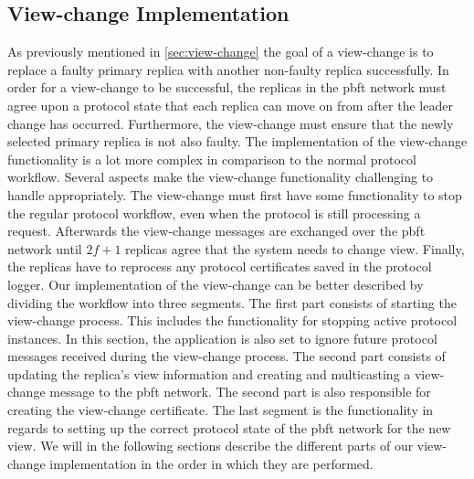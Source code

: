 \subsection{View-change Implementation}
As previously mentioned in \autoref{sec:view-change} the goal of a view-change is to replace a faulty primary replica with another non-faulty replica successfully. In order for a view-change to be successful, the replicas in the \ac{pbft} network must agree upon a  protocol state that each replica can move on from after the leader change has occurred. Furthermore, the view-change must ensure that the newly selected primary replica is not also faulty. The implementation of the view-change functionality is a lot more complex in comparison to the normal protocol workflow. Several aspects make the view-change functionality challenging to handle appropriately. The view-change must first have some functionality to stop the regular protocol workflow, even when the protocol is still processing a request. Afterwards the view-change messages are exchanged over the \ac{pbft} network until $2f+1$ replicas agree that the system needs to change view. Finally, the replicas have to reprocess any protocol certificates saved in the protocol logger. Our implementation of the view-change can be better described by dividing the workflow into three segments. The first part consists of starting the view-change process. This includes the functionality for stopping active protocol instances. In this section, the application is also set to ignore future protocol messages received during the view-change process. The second part consists of updating the replica's view information and creating and multicasting a view-change message to the \ac{pbft} network. The second part is also responsible for creating the view-change certificate. The last segment is the functionality in regards to setting up the correct protocol state of the \ac{pbft} network for the new view.
We will in the following sections describe the different parts of our view-change implementation in the order in which they are performed.

